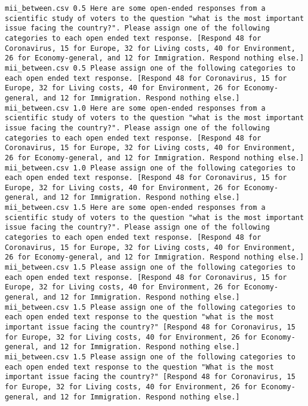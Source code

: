 \begin{lstlisting}[label=lst:promptvariants]
mii_between.csv	0.5	Here are some open-ended responses from a scientific study of voters to the question "what is the most important issue facing the country?". Please assign one of the following categories to each open ended text response. [Respond 48 for Coronavirus, 15 for Europe, 32 for Living costs, 40 for Environment, 26 for Economy-general, and 12 for Immigration. Respond nothing else.]
mii_between.csv	0.5	Please assign one of the following categories to each open ended text response. [Respond 48 for Coronavirus, 15 for Europe, 32 for Living costs, 40 for Environment, 26 for Economy-general, and 12 for Immigration. Respond nothing else.]
mii_between.csv	1.0	Here are some open-ended responses from a scientific study of voters to the question "what is the most important issue facing the country?". Please assign one of the following categories to each open ended text response. [Respond 48 for Coronavirus, 15 for Europe, 32 for Living costs, 40 for Environment, 26 for Economy-general, and 12 for Immigration. Respond nothing else.]
mii_between.csv	1.0	Please assign one of the following categories to each open ended text response. [Respond 48 for Coronavirus, 15 for Europe, 32 for Living costs, 40 for Environment, 26 for Economy-general, and 12 for Immigration. Respond nothing else.]
mii_between.csv	1.5	Here are some open-ended responses from a scientific study of voters to the question "what is the most important issue facing the country?". Please assign one of the following categories to each open ended text response. [Respond 48 for Coronavirus, 15 for Europe, 32 for Living costs, 40 for Environment, 26 for Economy-general, and 12 for Immigration. Respond nothing else.]
mii_between.csv	1.5	Please assign one of the following categories to each open ended text response. [Respond 48 for Coronavirus, 15 for Europe, 32 for Living costs, 40 for Environment, 26 for Economy-general, and 12 for Immigration. Respond nothing else.]
mii_between.csv	1.5	Please assign one of the following categories to each open ended text response to the question "what is the most important issue facing the country?" [Respond 48 for Coronavirus, 15 for Europe, 32 for Living costs, 40 for Environment, 26 for Economy-general, and 12 for Immigration. Respond nothing else.]
mii_between.csv	1.5	Please assign one of the following categories to each open ended text response to the question "What is the most important issue facing the country?" [Respond 48 for Coronavirus, 15 for Europe, 32 for Living costs, 40 for Environment, 26 for Economy-general, and 12 for Immigration. Respond nothing else.]

\end{lstlisting}
